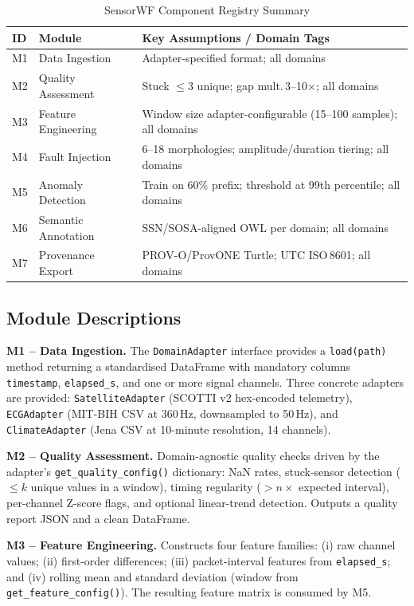 \documentclass[conference]{IEEEtran}
\begin{document}
\begin{table}[t]
\caption{SensorWF Component Registry Summary}
\label{tab:registry}
\centering
\scriptsize
\setlength{\tabcolsep}{3pt}
\begin{tabular}{@{}lp{1.9cm}p{3.8cm}@{}}
\toprule
\textbf{ID} & \textbf{Module} & \textbf{Key Assumptions / Domain Tags} \\
\midrule
M1 & Data Ingestion     & Adapter-specified format; all domains \\
M2 & Quality Assessment & Stuck $\le$3 unique; gap mult.\,3--10$\times$; all domains \\
M3 & Feature Engineering& Window size adapter-configurable (15--100 samples); all domains \\
M4 & Fault Injection    & 6--18 morphologies; amplitude/duration tiering; all domains \\
M5 & Anomaly Detection  & Train on 60\% prefix; threshold at 99th percentile; all domains \\
M6 & Semantic Annotation& SSN/SOSA-aligned OWL per domain; all domains \\
M7 & Provenance Export  & PROV-O/ProvONE Turtle; UTC ISO\,8601; all domains \\
\bottomrule
\end{tabular}
\end{table}

\subsection{Module Descriptions}

\textbf{M1 -- Data Ingestion.} The \texttt{DomainAdapter} interface provides a
\texttt{load(path)} method returning a standardised DataFrame with mandatory columns
\texttt{timestamp}, \texttt{elapsed\_s}, and one or more signal channels. Three
concrete adapters are provided: \texttt{SatelliteAdapter} (SCOTTI v2 hex-encoded
telemetry), \texttt{ECGAdapter} (MIT-BIH CSV at 360\,Hz, downsampled to 50\,Hz),
and \texttt{ClimateAdapter} (Jena CSV at 10-minute resolution, 14 channels).

\textbf{M2 -- Quality Assessment.} Domain-agnostic quality checks driven by the
adapter's \texttt{get\_quality\_config()} dictionary: NaN rates, stuck-sensor
detection ($\le k$ unique values in a window), timing regularity ($>n\times$ expected
interval), per-channel Z-score flags, and optional linear-trend detection. Outputs
a quality report JSON and a clean DataFrame.

\textbf{M3 -- Feature Engineering.} Constructs four feature families: (i) raw
channel values; (ii) first-order differences; (iii) packet-interval features from
\texttt{elapsed\_s}; and (iv) rolling mean and standard deviation (window from
\texttt{get\_feature\_config()}). The resulting feature matrix is consumed by M5.
\end{document}
